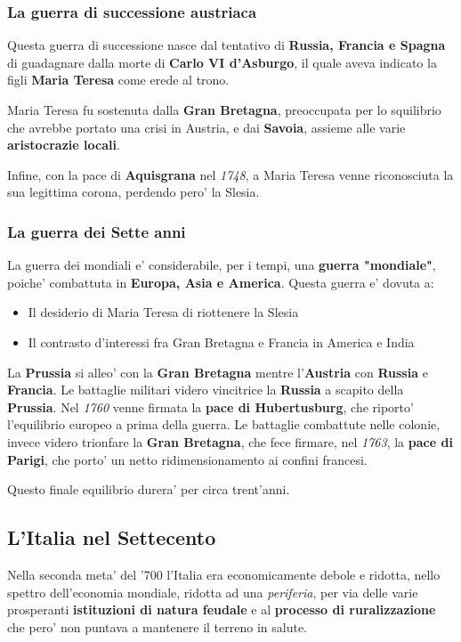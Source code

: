 \documentclass{article}
\begin{document}
{{    \subsubsection{La guerra di successione austriaca} %
    Questa guerra di successione nasce dal tentativo di \textbf{Russia, Francia e Spagna} di guadagnare dalla morte di \textbf{Carlo VI d'Asburgo}, il quale aveva indicato la figli \textbf{Maria Teresa} come erede al trono.

    Maria Teresa fu sostenuta dalla \textbf{Gran Bretagna}, preoccupata per lo squilibrio che avrebbe portato una crisi in Austria, e dai \textbf{Savoia}, assieme alle varie \textbf{aristocrazie locali}.

    Infine, con la pace di \textbf{Aquisgrana} nel \textit{1748}, a Maria Teresa venne riconosciuta la sua legittima corona, perdendo pero' la Slesia.

    \subsubsection{La guerra dei Sette anni} %
    La guerra dei mondiali e' considerabile, per i tempi, una \textbf{guerra "mondiale"}, poiche' combattuta in \textbf{Europa, Asia e America}. Questa guerra e' dovuta a:

    \begin{itemize}
      \item Il desiderio di Maria Teresa di riottenere la Slesia
      \item Il contrasto d'interessi fra Gran Bretagna e Francia in America e India
    \end{itemize}

    La \textbf{Prussia} si alleo' con la \textbf{Gran Bretagna} mentre l'\textbf{Austria} con \textbf{Russia} e \textbf{Francia}. Le battaglie militari videro vincitrice la \textbf{Russia} a scapito della \textbf{Prussia}. Nel \textit{1760} venne firmata la \textbf{pace di Hubertusburg}, che riporto' l'equilibrio europeo a prima della guerra. Le battaglie combattute nelle colonie, invece videro trionfare la \textbf{Gran Bretagna}, che fece firmare, nel \textit{1763}, la \textbf{pace di Parigi}, che porto' un netto ridimensionamento ai confini francesi.

    Questo finale equilibrio durera' per circa trent'anni.

    \subsection{L'Italia nel Settecento}
    Nella seconda meta' del '700 l'Italia era economicamente debole e ridotta, nello spettro dell'economia mondiale, ridotta ad una \textit{periferia}, per via delle varie prosperanti \textbf{istituzioni di natura feudale} e al \textbf{processo di ruralizzazione} che pero' non puntava a mantenere il terreno in salute.

}}
\end{document}
